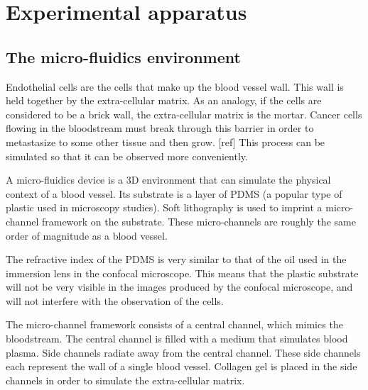 
\chapter{Experimental apparatus}

\ifpdf
    \graphicspath{{Chapter4/Figs/Raster/}{Chapter4/Figs/PDF/}{Chapter4/Figs/}}
\else
    \graphicspath{{Chapter4/Figs/Vector/}{Chapter4/Figs/}}
\fi

\section{The micro-fluidics environment}

Endothelial cells are the cells that make up the blood vessel wall. This wall is held together by the extra-cellular matrix. As an analogy, if the cells are considered to be a brick wall, the extra-cellular matrix is the mortar. Cancer cells flowing in the bloodstream must break through this barrier in order to metastasize to some other tissue and then grow. [ref] This process can be simulated so that it can be observed more conveniently.

A micro-fluidics device is a 3D environment that can simulate the physical context of a blood vessel. Its substrate is a layer of PDMS (a popular type of plastic used in microscopy studies). Soft lithography is used to imprint a micro-channel framework on the substrate. These micro-channels are roughly the same order of magnitude as a blood vessel.

The refractive index of the PDMS is very similar to that of the oil used in the immersion lens in the confocal microscope. This means that the plastic substrate will not be very visible in the images produced by the confocal microscope, and will not interfere with the observation of the cells.

The micro-channel framework consists of a central channel, which mimics the bloodstream. The central channel is filled with a medium that simulates blood plasma. Side channels radiate away from the central channel. These side channels each represent the wall of a single blood vessel. Collagen gel is placed in the side channels in order to simulate the extra-cellular matrix.

